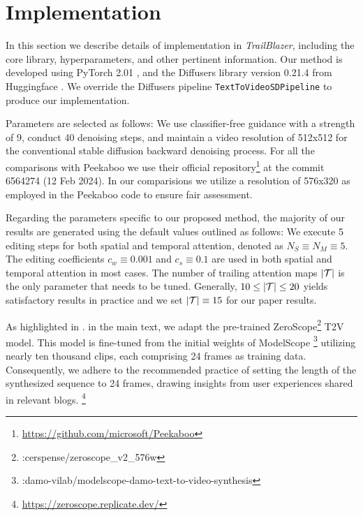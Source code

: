 

\section{Implementation}
\label{sec:impl}

In this section we describe details of  implementation in \textit{TrailBlazer}, including the core library, hyperparameters, and other pertinent information. Our method is developed using PyTorch 2.01 \cite{paszke2019pytorch}, and the Diffusers library version 0.21.4 from Huggingface \cite{huggingface}. We override the Diffusers pipeline \texttt{TextToVideoSDPipeline} to produce our implementation.

Parameters are selected as follows: We use classifier-free guidance with a strength of 9, conduct 40 denoising steps, and maintain a video resolution of 512x512 for the conventional stable diffusion backward denoising process. For all the comparisons with Peekaboo \cite{jain2023peekaboo} we use their official repository\footnote{\href{https://github.com/microsoft/Peekaboo}{https://github.com/microsoft/Peekaboo}} at the commit 6564274 (12 Feb 2024). In our comparisions we utilize a resolution of 576x320 as employed in the Peekaboo code to ensure fair assessment.

Regarding the parameters specific to our proposed method, the majority of our results are generated using the default values outlined as follows: We execute 5 editing steps for both spatial and temporal attention, denoted as $N_S \equiv N_M \equiv 5$. The editing coefficients $c_w \equiv 0.001$ and $c_s \equiv 0.1$ are used in both spatial and temporal attention in most cases. The number of trailing attention maps $|\mathcal{T}|$ is the only parameter that needs to be tuned. Generally, $10 \leq |\mathcal{T}| \leq 20$ yields satisfactory results in practice and we set $|\mathcal{T}| \equiv 15$ for our paper results.

As highlighted in . in the main text, we adapt the pre-trained ZeroScope\footnote{\cite{huggingface}:cerspense/zeroscope\_v2\_576w} \cite{zeroscope} T2V model. This model is fine-tuned from the initial weights of ModelScope \cite{luo2023videofusion}\footnote{\cite{huggingface}:damo-vilab/modelscope-damo-text-to-video-synthesis} utilizing nearly ten thousand clips, each comprising 24 frames as training data. Consequently, we adhere to the recommended practice of setting the length of the synthesized sequence to 24 frames, drawing insights from user experiences shared in relevant blogs. \footnote{\href{https://zeroscope.replicate.dev/}{https://zeroscope.replicate.dev/}}

